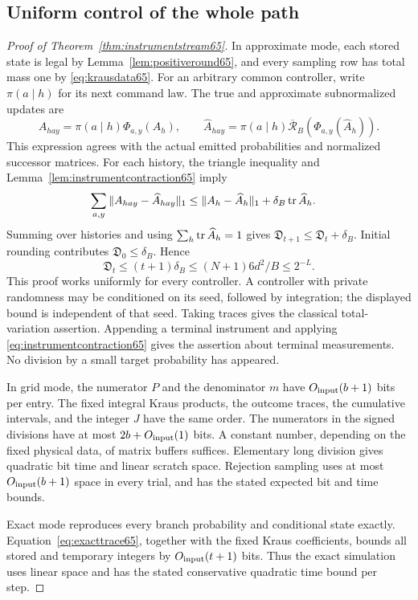 \subsection{Uniform control of the whole path}
\begin{proof}[Proof of Theorem~\ref{thm:instrumentstream65}]
In approximate mode, each stored state is legal by
Lemma~\ref{lem:positiveround65}, and every sampling row has total
mass one by \eqref{eq:krausdata65}. For an arbitrary common controller,
write $\pi(a\mid h)$ for its next command law. The true and approximate
subnormalized updates are
\[
 A_{hay}=\pi(a\mid h)\Phi_{a,y}(A_h),\qquad
 \widehat A_{hay}=\pi(a\mid h)
                \overline{\mathcal R}_B(\Phi_{a,y}(\widehat A_h)).
\]
This expression agrees with the actual emitted probabilities and
normalized successor matrices. For each history, the triangle
inequality and Lemma~\ref{lem:instrumentcontraction65} imply
\begin{align*}
 \sum_{a,y}\|A_{hay}-\widehat A_{hay}\|_1
 &\le\|A_h-\widehat A_h\|_1+
          \delta_B\operatorname{tr}\widehat A_h .
\end{align*}
Summing over histories and using $\sum_h\operatorname{tr}\widehat A_h=1$ gives
$\mathfrak D_{t+1}\le\mathfrak D_t+\delta_B$.
Initial rounding contributes $\mathfrak D_0\le\delta_B$.
Hence
\[
                  \mathfrak D_t\le(t+1)\delta_B
                    \le(N+1)6d^2/B\le2^{-L}.
\]
This proof works uniformly for every controller. A controller with
private randomness may be conditioned on its seed, followed by
integration; the displayed bound is independent of that seed.
Taking traces gives the classical total-variation assertion.
Appending a terminal instrument and applying
\eqref{eq:instrumentcontraction65} gives the assertion about terminal
measurements. No division by a small target probability has appeared.

In grid mode, the numerator $P$ and the denominator $m$ have
$O_{\rm input}(b+1)$ bits per entry. The fixed integral Kraus products,
the outcome traces, the cumulative intervals, and the integer $J$
have the same order. The numerators in the signed divisions have at
most $2b+O_{\rm input}(1)$ bits. A constant number, depending on the
fixed physical data, of matrix buffers suffices. Elementary long
division gives quadratic bit time and linear scratch space. Rejection
sampling uses at most $O_{\rm input}(b+1)$ space in every trial,
and has the stated expected bit and time bounds.

Exact mode reproduces every branch probability and conditional state
exactly. Equation~\eqref{eq:exacttrace65}, together with the fixed
Kraus coefficients, bounds all stored and temporary integers by
$O_{\rm input}(t+1)$ bits. Thus the exact simulation uses linear
space and has the stated conservative quadratic time bound per step.


\end{proof}
